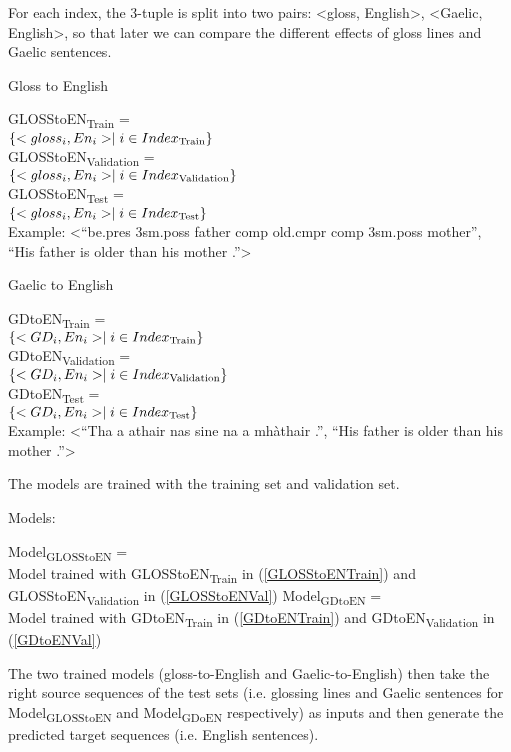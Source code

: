 \documentclass[11pt,a4paper]{article}
\begin{document}
For each index, the 3-tuple is split into two pairs: <gloss, English>, <Gaelic, English>, so that later we can compare the different effects of gloss lines and Gaelic sentences. 
\begin{exe}
	\ex Gloss to English
		\begin{xlist}
		\ex \label{GLOSStoENTrain} GLOSStoEN\textsubscript{Train}   =\\$\{<gloss_i,En_i>  \mid i \in Index\textsubscript{Train} \}$ \\
		\ex \label{GLOSStoENVal} GLOSStoEN\textsubscript{Validation}   = \\$\{<gloss_i,En_i>  \mid i \in Index\textsubscript{Validation} \}$ \\
		\ex \label{GLOSStoENTest}GLOSStoEN\textsubscript{Test} = \\$\{<gloss_i,En_i>  \mid i \in Index\textsubscript{Test} \}$ \\
		\ex  Example: <``be.pres 3sm.poss father comp old.cmpr comp 3sm.poss mother'', ``His father is older than his mother .''>
		\end{xlist}

	
	\ex Gaelic to English
		\begin{xlist}
		\ex \label{GDtoENTrain} GDtoEN\textsubscript{Train}   = \\$\{<GD_i,En_i>  \mid i \in Index\textsubscript{Train} \}$ \\
		\ex \label{GDtoENVal} GDtoEN\textsubscript{Validation}   =\\ $\{<GD_i,En_i>  \mid i \in Index\textsubscript{Validation} \}$ \\
		\ex \label{GDtoENTest} GDtoEN\textsubscript{Test}    = \\$\{<GD_i,En_i>  \mid i \in Index\textsubscript{Test} \}$ \\
		\ex Example: <``Tha a athair nas sine na a mh\`athair .'', ``His father is older than his mother .''>
		\end{xlist}
\end{exe}
The models are trained with the training set and validation set. 

\begin{exe}
\ex Models:
	\begin{xlist}
	\ex \label{ModelGlossToEN} Model\textsubscript{GLOSStoEN} =\\ Model trained with GLOSStoEN\textsubscript{Train} in (\ref{GLOSStoENTrain}) and GLOSStoEN\textsubscript{Validation} in (\ref{GLOSStoENVal})
	\ex \label{ModelGDToEN}Model\textsubscript{GDtoEN} =\\ Model trained with GDtoEN\textsubscript{Train} in (\ref{GDtoENTrain}) and GDtoEN\textsubscript{Validation} in (\ref{GDtoENVal})
	\end{xlist}	
\end{exe}
The two trained models (gloss-to-English and Gaelic-to-English) then take the right source sequences of the test sets (i.e. glossing lines and Gaelic sentences for Model\textsubscript{GLOSStoEN} and Model\textsubscript{GDoEN} respectively) as inputs and then generate the predicted target sequences (i.e. English sentences).
\end{document}
